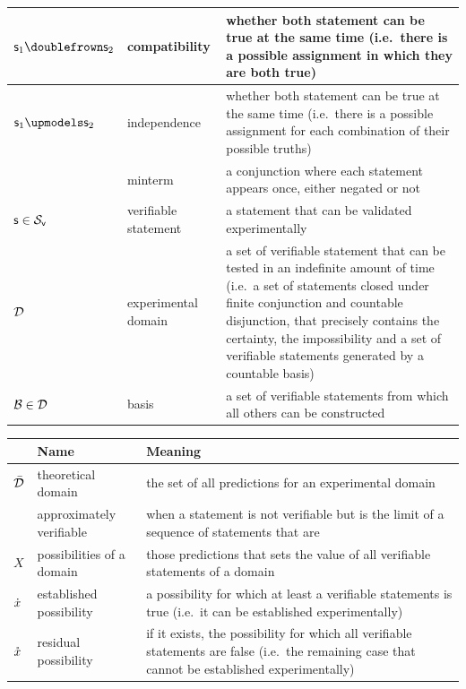 \documentclass[11pt,letterpaper,fleqn]{memoir} %
\begin{document}
\begin{tabular}{p{} p{} p{}}
	$\stmt_1 \comp \stmt_2$ & compatibility & whether both statement can be true at the same time (i.e.~there is a possible assignment in which they are both true) \\
	\hline 
	$\stmt_1 \indep \stmt_2$ & independence & whether both statement can be true at the same time (i.e.~there is a possible assignment for each combination of their possible truths) \\
	\hline 
	& minterm & a conjunction where each statement appears once, either negated or not \\
	\hline 
	$\mathsf{s} \in \mathcal{S}_\textsf{v}$ & verifiable statement & a statement that can be validated experimentally\\ 
	\hline 
	$\mathcal{D}$ & experimental domain & a set of verifiable statement that can be tested in an indefinite amount of time (i.e.~a set of statements closed under finite conjunction and countable disjunction, that precisely contains the certainty, the impossibility and a set of verifiable statements generated by a countable basis) \\ 
	\hline 
	$\mathcal{B} \in \mathcal{D}$ & basis & a set of verifiable statements from which all others can be constructed\\ 
			
\end{tabular} 

\newpage

\begin{tabular}{p{} p{} p{}}
	& Name & Meaning  \\ 
	\hline 
	$\bar{\mathcal{D}}$ & theoretical domain & the set of all predictions for an experimental domain\\ 
	\hline 
	& approximately verifiable & when a statement is not verifiable but is the limit of a sequence of statements that are\\ 
	\hline 
	$X$ & possibilities of a domain & those predictions that sets the value of all verifiable statements of a domain\\ 
	\hline 
	$\dot{x}$ & established possibility & a possibility for which at least a verifiable statements is true (i.e.~it can be established experimentally)\\ 
	\hline 
	$\mathring{x}$ & residual possibility & if it exists, the possibility for which all verifiable statements are false (i.e.~the remaining case that cannot be established experimentally)\\ 
	
\end{tabular} 
\end{document}
